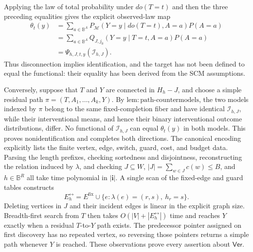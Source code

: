 Applying the law of total probability under \(do(T=t)\) and then the three preceding equalities gives the explicit observed-law map
\[
 \begin{aligned}
 \theta_t(y)
 &=\sum_{a\in\mathbb B^A}
 P_{\mathcal M}(Y=y\mid do(T=t),A=a)P(A=a)\\
 &=\sum_{a\in\mathbb B^A}
 Q_{J,j_0}(Y=y\mid T=t,A=a)P(A=a)\\
 &=\Psi_{h,J,t,y}(\mathcal I_{h,J}).
 \end{aligned}
\]
Thus disconnection implies identification, and the target has not been defined to equal the functional: their equality has been derived from the SCM assumptions.

Conversely, suppose that \(T\) and \(Y\) are connected in \(H_h-J\), and choose a simple residual path \(\pi=(T,A_1,\ldots,A_k,Y)\).  By \(\mathrm{lem{:}path\text{-}countermodels}\), the two models indexed by \(\pi\) belong to the same fixed-completion fiber and have identical \(\mathcal I_{h,J}\), while their interventional means, and hence their binary interventional outcome distributions, differ.  No functional of \(\mathcal I_{h,J}\) can equal \(\theta_t(y)\) in both models.  This proves nonidentification and completes both directions.
The canonical encoding explicitly lists the finite vertex, edge, switch, guard, cost, and budget data.  Parsing the length prefixes, checking sortedness and disjointness, reconstructing the relation induced by \(\lambda\), and checking \(J\subseteq W\), \(|J|=\sum_{w\in J}c(w)\le B\), and \(h\in\mathbb B^R\) all take time polynomial in \(|\mathbf i|\).  A single scan of the fixed-edge and guard tables constructs
\[
 E_h^{\leftrightarrow}=E^{\mathrm{fix}}\cup
 \{e:\lambda(e)=(r,s),\ h_r=s\}.
\]
Deleting vertices in \(J\) and their incident edges is linear in the explicit graph size.  Breadth-first search from \(T\) then takes \(O(|V|+|E_h^{\leftrightarrow}|)\) time and reaches \(Y\) exactly when a residual \(T\)-to-\(Y\) path exists.  The predecessor pointer assigned on first discovery has no repeated vertex, so reversing those pointers returns a simple path whenever \(Y\) is reached.  These observations prove every assertion about \(\mathsf{Ver}\).

